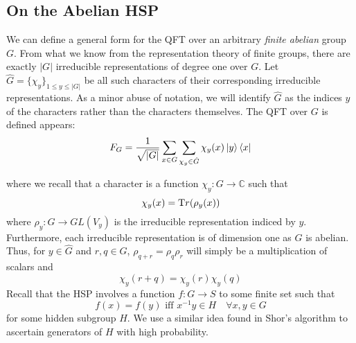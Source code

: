 \subsection{On the Abelian HSP}

We can define a general form for the QFT over an arbitrary \textit{finite abelian} group $G$. From what we know from the representation theory of finite groups, there are exactly $|G|$ irreducible representations of degree one over $G$. Let $\hat{G} = \{\chi_y\}_{1 \leq y \leq |G|}$ be all such characters of their corresponding irreducible representations. As a minor abuse of notation, we will identify $\hat{G}$ as the indices $y$ of the characters rather than the characters themselves. The QFT over $G$ is defined appears:
%
\begin{equation}
  \label{abelQFT}
  F_{G} = \frac{1}{\sqrt{|G|}}\sum_{x \in G}\sum_{\chi_y \in \hat{G}} \chi_y(x) \ket{y}\bra{x}
\end{equation}

where we recall that a character is a function $\chi_y: G \rightarrow \mathbb{C}$ such that
$$ \chi_y(x) = {\text Tr}(\rho_y(x)) $$ where $\rho_y : G \rightarrow GL(V_y)$ is the irreducible representation indiced by $y$. Furthermore, each irreducible representation is of dimension one as $G$ is abelian.
%
Thus, for $y \in \hat{G}$ and $r,q \in G$, $\rho_{q+r} = \rho_q\rho_r$ will simply be a multiplication of scalars and
\begin{equation}
  \label{abelianscale}
  \chi_y(r + q) = \chi_y(r)\chi_y(q)
\end{equation}
%
Recall that the HSP involves a function $f: G \rightarrow S$ to some finite set such that
%
$$ f(x) = f(y) \text{ iff } x^{-1}y \in H \quad \forall x,y \in G$$ for some hidden subgroup $H$. We use a similar idea found in Shor's algorithm to ascertain generators of $H$ with high probability.
%

